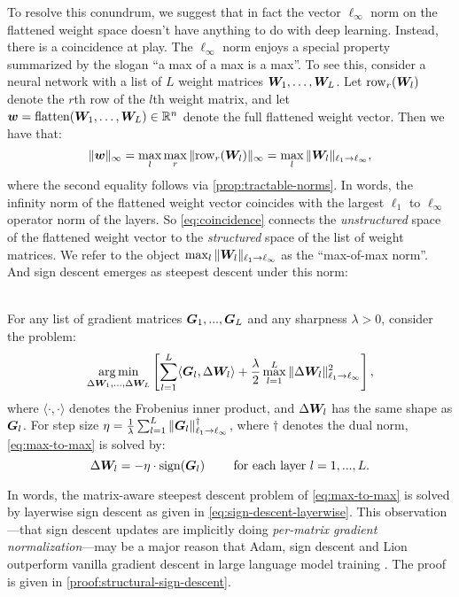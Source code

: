 To resolve this conundrum, we suggest that in fact the vector $\ell_\infty$ norm on the flattened weight space doesn't have anything to do with deep learning. Instead, there is a coincidence at play. The $\ell_\infty$ norm enjoys a special property summarized by the slogan ``a max of a max is a max''. To see this, consider a neural network with a list of $L$ weight matrices ${\bm{W}}_1, \dots, {\bm{W}}_L$. Let $\mathrm{row}_r({\bm{W}}_l)$ denote the $r$th row of the $l$th weight matrix, and let ${\bm{w}} = \operatorname{flatten}({\bm{W}}_1, \dots, {\bm{W}}_L) \in \mathbb{R}^n$ denote the full flattened weight vector. Then we have that:
\begin{equation}\label{eq:coincidence}
    \Vert {{\bm{w}}} \Vert_\infty = \max_{l} \max_r \Vert { \mathrm{row}_r({\bm{W}}_l) } \Vert_\infty = \max_{l} \Vert {{\bm{W}}_l} \Vert_{\ell_1\to\ell_\infty},
\end{equation}
where the second equality follows via \cref{prop:tractable-norms}. In words, the infinity norm of the flattened weight vector coincides with the largest $\ell_1$ to $\ell_\infty$ operator norm of the layers. So \cref{eq:coincidence} connects the \textit{unstructured} space of the flattened weight vector to the \textit{structured} space of the list of weight matrices. We refer to the object $\max_{l} \Vert {{\bm{W}}_l} \Vert_{\ell_1\to\ell_\infty}$ as the ``max-of-max norm''. And sign descent emerges as steepest descent under this norm:
\begin{myproposition}\label{prop:structural-sign-descent}
    \\For any list of gradient matrices ${\bm{G}}_1,...,{\bm{G}}_L$ and any sharpness $\lambda > 0$, consider the problem:
    \begin{equation}\label{eq:max-to-max}
        \operatorname*{arg\,min}_{\Delta {\bm{W}}_1,...,\Delta {\bm{W}}_L} \left[ \sum_{l=1}^L \langle{\bm{G}}_l, \Delta {\bm{W}}_l\rangle + \frac{\lambda}{2} \max_{l=1}^L \Vert {\Delta{\bm{W}}_l} \Vert_{\ell_1\to\ell_\infty}^2 \right],
    \end{equation}
    where $\langle\cdot, \cdot\rangle$ denotes the Frobenius inner product, and $\Delta {\bm{W}}_l$ has the same shape as ${\bm{G}}_l$. For step size $\eta = \frac{1}{\lambda}\sum_{l=1}^L \Vert {{\bm{G}}_l} \Vert_{\ell_1\to\ell_\infty}^\dagger$, where $\dagger$ denotes the dual norm, \cref{eq:max-to-max} is solved by:
    \begin{equation}\label{eq:sign-descent-layerwise}
        \Delta {\bm{W}}_l = - \eta \cdot \operatorname{sign}({\bm{G}}_l) \qquad \text{ for each layer } l=1,...,L.
    \end{equation}
\end{myproposition}
In words, the matrix-aware steepest descent problem of \cref{eq:max-to-max} is solved by layerwise sign descent as given in \cref{eq:sign-descent-layerwise}. This observation---that sign descent updates are implicitly doing \textit{per-matrix gradient normalization}---may be a major reason that Adam, sign descent and Lion \citep{chen2023symbolic} outperform vanilla gradient descent in large language model training \citep{Zhao2024Deconstructing, modula}. The proof is given in \cref{proof:structural-sign-descent}.

